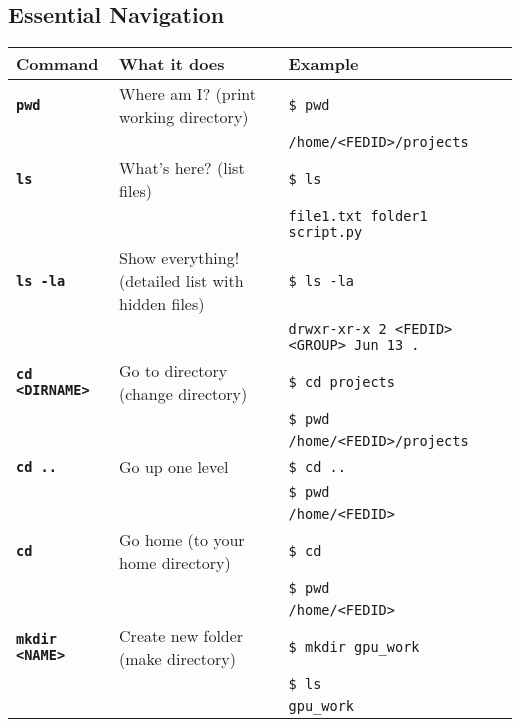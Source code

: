 \documentclass[10pt, a4paper, landscape]{article}
\newcommand{\cmd}[2]{\textcolor{#1}{\textbf{\texttt{#2}}}}
\newcommand{\placeholder}[1]{\texttt{<#1>}}
\begin{document}
\begin{multicols}{2}
\footnotesize %

\section*{Essential Navigation}

\begin{tabular}{@{}p{2.5cm}p{3.5cm}p{4cm}@{}}
\toprule
\textbf{Command} & \textbf{What it does} & \textbf{Example} \\
\midrule
\cmd{navigation}{pwd} & Where am I? (print working directory) & \scriptsize\texttt{\$ pwd}\\
& & \scriptsize\texttt{/home/<FEDID>/projects}\\[1pt]
\cmd{navigation}{ls} & What's here? (list files) & \scriptsize\texttt{\$ ls}\\
& & \scriptsize\texttt{file1.txt folder1 script.py}\\[1pt]
\cmd{navigation}{ls -la} & Show everything! (detailed list with hidden files) & \scriptsize\texttt{\$ ls -la}\\
& & \scriptsize\texttt{drwxr-xr-x 2 <FEDID> <GROUP> Jun 13 .}\\[1pt]
\cmd{navigation}{cd \placeholder{DIRNAME}} & Go to directory (change directory) & \scriptsize\texttt{\$ cd projects}\\
& & \scriptsize\texttt{\$ pwd}\\
& & \scriptsize\texttt{/home/<FEDID>/projects}\\[1pt]
\cmd{navigation}{cd ..} & Go up one level & \scriptsize\texttt{\$ cd ..}\\
& & \scriptsize\texttt{\$ pwd}\\
& & \scriptsize\texttt{/home/<FEDID>}\\[1pt]
\cmd{navigation}{cd} & Go home (to your home directory) & \scriptsize\texttt{\$ cd}\\
& & \scriptsize\texttt{\$ pwd}\\
& & \scriptsize\texttt{/home/<FEDID>}\\[1pt]
\cmd{navigation}{mkdir \placeholder{NAME}} & Create new folder (make directory) & \scriptsize\texttt{\$ mkdir gpu\_work}\\
& & \scriptsize\texttt{\$ ls}\\
& & \scriptsize\texttt{gpu\_work}\\
\bottomrule
\end{tabular}


\end{multicols}
\end{document}
